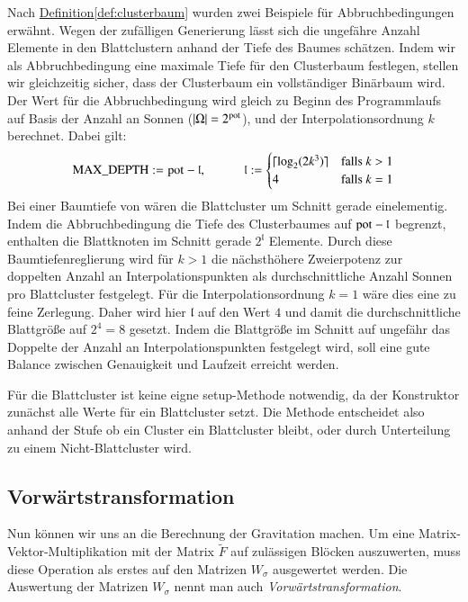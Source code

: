     Nach \hyperref[def:clusterbaum]{Definition}\autoref{def:clusterbaum} wurden zwei Beispiele für Abbruchbedingungen erwähnt. Wegen der zufälligen Generierung lässt sich die ungefähre Anzahl Elemente
    in den Blattclustern anhand der Tiefe des Baumes schätzen. Indem wir als Abbruchbedingung eine maximale Tiefe für den Clusterbaum festlegen, stellen wir gleichzeitig sicher, dass der Clusterbaum
    ein vollständiger Binärbaum wird.
    Der Wert  für die Abbruchbedingung wird gleich zu Beginn des Programmlaufs auf Basis der Anzahl an Sonnen ($|\Omega| = 2^{\tcode{pot}}$), und der Interpolationsordnung $k$ 
    berechnet. Dabei gilt:
    \begin{equation*}
      \tcode{MAX\_DEPTH} := \tcode{pot} - \mathfrak{l}, \ \ \ \ \ \ \ \ \ \ \ \ 
      \mathfrak{l} :=
      \begin{cases}
	\lceil \log_2(2 k^3) \rceil & \text{falls } k > 1\\
	4			    & \text{falls } k = 1
      \end{cases}
    \end{equation*}
    Bei einer Baumtiefe von  wären die Blattcluster um Schnitt gerade einelementig. Indem die Abbruchbedingung die Tiefe des Clusterbaumes auf $\tcode{pot} - \mathfrak{l}$ begrenzt,
    enthalten die Blattknoten im Schnitt gerade $2^\mathfrak{l}$ Elemente.
    Durch diese Baumtiefenreglierung wird für $k > 1$ die nächsthöhere Zweierpotenz zur doppelten Anzahl an Interpolationspunkten als durchschnittliche Anzahl Sonnen pro Blattcluster festgelegt. 
    Für die Interpolationsordnung $k = 1$ wäre dies eine zu feine Zerlegung. Daher wird hier $\mathfrak{l}$  auf den Wert $4$ und damit die durchschnittliche Blattgröße auf $2^4 = 8$ gesetzt.
    Indem die Blattgröße im Schnitt auf ungefähr das Doppelte der Anzahl an Interpolationspunkten festgelegt wird, soll eine gute Balance zwischen Genauigkeit und Laufzeit erreicht werden.
        
    Für die Blattcluster ist keine eigne setup-Methode notwendig, da der Konstruktor \mbox{} zunächst alle Werte für ein Blattcluster setzt. Die Methode \linebreak
    \mbox{\code{\_setup(...)}} entscheidet also anhand der Stufe ob ein Cluster ein Blattcluster bleibt, oder durch Unterteilung zu einem Nicht-Blattcluster wird.

    \subsection{Vorwärtstransformation}
    
    Nun können wir uns an die Berechnung der Gravitation machen.
    Um eine Matrix-Vektor-Multiplikation mit der Matrix $\tilde F$ auf zulässigen Blöcken auszuwerten, muss diese Operation als erstes auf den Matrizen $W_\sigma$ ausgewertet werden.
    Die Auswertung der Matrizen $W_\sigma$ nennt man auch \textit{Vorwärtstransformation}.
    
